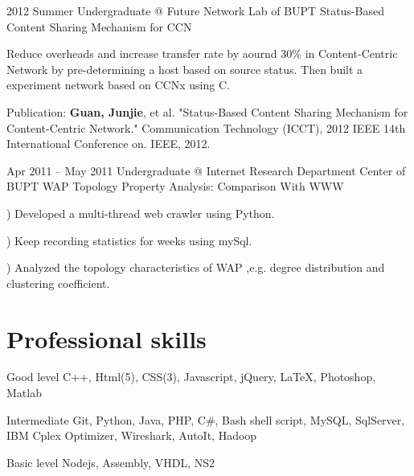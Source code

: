 \documentclass{tccv}
\begin{document}
\begin{eventlist}

\item{2012 Summer}
     {Undergraduate @ Future Network Lab of BUPT}
     {Status-Based Content Sharing Mechanism for CCN}
     
	Reduce overheads and increase transfer rate by aournd 30\% in Content-Centric Network by pre-determining a host based on source status. Then built a experiment network based on CCNx using C. 

Publication: \textbf{Guan, Junjie}, et al. "Status-Based Content Sharing Mechanism for Content-Centric Network." Communication Technology (ICCT), 2012 IEEE 14th International Conference on. IEEE, 2012. 

\item{Apr 2011 -- May 2011}
     {Undergraduate @ Internet Research Department Center of BUPT}
     {WAP Topology Property Analysis: Comparison With WWW}     
     
) Developed a multi-thread web crawler using Python. 

) Keep recording statistics for weeks using mySql. 

) Analyzed the topology characteristics of WAP ,e.g. degree distribution and clustering coefficient.\newline

\end{eventlist}






















\if
\section{Professional skills}

\begin{factlist}

\item{Good level}
     {C++, Html(5), CSS(3), Javascript, jQuery, \LaTeX, Photoshop, Matlab}

\item{Intermediate}
     {Git, Python, Java, PHP, C\#, Bash shell script, MySQL, SqlServer, IBM Cplex Optimizer, Wireshark, AutoIt, Hadoop}

\item{Basic level}
     {Nodejs, Assembly, VHDL, NS2}

\end{factlist}

\fi
\end{document}

